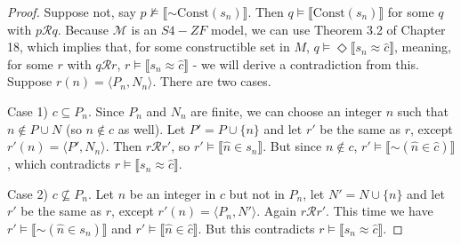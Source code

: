 \documentclass{article}
\newcommand*{\oldneg}{\mathord{\sim}}
\newcommand{\lbc}{\llbracket}
\newcommand{\rbc}{\rrbracket}
\theoremstyle{definition}
\begin{document}
\begin{proof}
Suppose not, say $p\nvDash\lbc\oldneg\textrm{Const}(s_n)\rbc$. Then $q\vDash\lbc\textrm{Const}(s_n)\rbc$ for some 
$q$ with $p\mathcal{R}q$. Because $\mathcal{M}$ is an $S4-ZF$ model, we can use Theorem 3.2 of Chapter 18, which implies that, for 
some constructible set in $M$, $q\vDash\Diamond\lbc s_n\approx\hat{c}\rbc$, meaning, for 
some $r$ with $q\mathcal{R}r$, $r\vDash\lbc s_n\approx\hat{c}\rbc$ - we will derive a contradiction from this. Suppose 
$r(n)=\langle P_n,N_n\rangle$. There are two cases.

Case 1) $c\subseteq P_n$. Since $P_n$ and $N_n$ are finite, we can choose an integer $n$ such that 
$n\notin P\cup N$ (so $n\notin c$ as well). Let $P'=P\cup\{n\}$ and let $r'$ be the same as $r$, except 
$r'(n)=\langle P',N_n\rangle$. Then $r\mathcal{R}r'$, so $r'\vDash\lbc\hat{n}\in s_n\rbc$. But since 
$n\notin c$, $r'\vDash\lbc\oldneg(\hat{n}\in\hat{c})\rbc$, which contradicts $r\vDash\lbc s_n\approx\hat{c}\rbc$.

Case 2) $c\nsubseteq P_n$. Let $n$ be an integer in $c$ but not in $P_n$, let $N'=N\cup\{n\}$ and let 
$r'$ be the same as $r$, except $r'(n)=\langle P_n,N'\rangle$. Again $r\mathcal{R}r'$. This time we have 
$r'\vDash\lbc\oldneg(\hat{n}\in s_n)\rbc$ and $r'\vDash\lbc\hat{n}\in\hat{c}\rbc$. But this contradicts 
$r\vDash\lbc s_n\approx\hat{c}\rbc$.

\end{proof}
\end{document}
